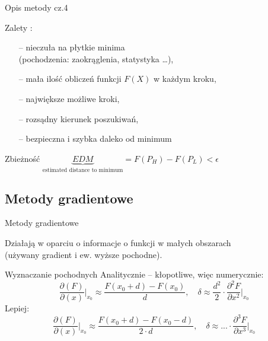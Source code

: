   \begin{frame}{Opis metody cz.4}

	\begin{block}{Zalety :}
	  	\begin{itemize}
	  		\item[--] nieczuła na płytkie minima
	  		\\(pochodzenia: zaokrąglenia, statystyka \ldots),
	  		\item[--] mała ilość obliczeń funkcji $F(X)$ w każdym kroku,
	  		\item[--] największe możliwe kroki,
	  		\item[--] rozsądny kierunek poszukiwań,
	  		\item[--] bezpieczna i szybka daleko od minimum
	  	\end{itemize}
    \end{block}
    \begin{block}{Zbieżność}
	  	$\underbrace{EDM}_{ \text{estimated distance to minimum}} = F(P_H) - F(P_L) < \epsilon$
    \end{block}

  \end{frame}

\subsection{Metody gradientowe}

  \begin{frame}{Metody gradientowe}

 	Działają w oparciu o informacje o funkcji w małych obszarach
 	\\(używany gradient i ew. wyższe pochodne).
    \begin{block}{Wyznaczanie pochodnych}
 	   Analitycznie -- kłopotliwe, więc numerycznie:
 	   \begin{displaymath}
 	   	  \frac{\partial (F)}{\partial (x)} \bigg\vert_{x_0} \approx \frac{F(x_0+d) - F(x_0)}{d},
 	   	  \quad \delta \approx \frac{d^2}{2} \cdot \frac{\partial^2 F}{\partial x^2} \bigg\vert_{x_0}
 	   \end{displaymath}
 	   Lepiej:
 	   \begin{displaymath}
 	   	  \frac{\partial (F)}{\partial (x)} \bigg\vert_{x_0} \approx \frac{F(x_0+d) - F(x_0-d)}{2\cdot d},
 	   	  \quad \delta \approx ... \cdot \frac{\partial^3 F}{\partial x^3} \bigg\vert_{x_0}
 	   \end{displaymath}
  	\end{block}

  \end{frame}


